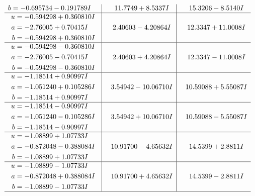\documentclass[1p]{elsarticle_modified}
\theoremstyle{definition}
\begin{document}
$$\begin{array}{c|c|c}
\begin{aligned}
b &= -0.695734 - 0.191789 I\end{aligned}
 & \phantom{-}11.7749 + 8.5337 I & \phantom{-}15.3206 - 8.5140 I \\ \hline\begin{aligned}
u &= -0.594298 + 0.360810 I \\
a &= -2.76005 + 0.70415 I \\
b &= -0.594298 + 0.360810 I\end{aligned}
 & \phantom{-}2.40603 - 4.20864 I & \phantom{-}12.3347 + 11.0008 I \\ \hline\begin{aligned}
u &= -0.594298 - 0.360810 I \\
a &= -2.76005 - 0.70415 I \\
b &= -0.594298 - 0.360810 I\end{aligned}
 & \phantom{-}2.40603 + 4.20864 I & \phantom{-}12.3347 - 11.0008 I \\ \hline\begin{aligned}
u &= -1.18514 + 0.90997 I \\
a &= -1.051240 + 0.105286 I \\
b &= -1.18514 + 0.90997 I\end{aligned}
 & \phantom{-}3.54942 - 10.06710 I & \phantom{-}10.59088 + 5.55087 I \\ \hline\begin{aligned}
u &= -1.18514 - 0.90997 I \\
a &= -1.051240 - 0.105286 I \\
b &= -1.18514 - 0.90997 I\end{aligned}
 & \phantom{-}3.54942 + 10.06710 I & \phantom{-}10.59088 - 5.55087 I \\ \hline\begin{aligned}
u &= -1.08899 + 1.07733 I \\
a &= -0.872048 - 0.388084 I \\
b &= -1.08899 + 1.07733 I\end{aligned}
 & \phantom{-}10.91700 - 4.65632 I & \phantom{-}14.5399 + 2.8811 I \\ \hline\begin{aligned}
u &= -1.08899 - 1.07733 I \\
a &= -0.872048 + 0.388084 I \\
b &= -1.08899 - 1.07733 I\end{aligned}
 & \phantom{-}10.91700 + 4.65632 I & \phantom{-}14.5399 - 2.8811 I\\
 \hline 
 \end{array}$$\newpage\newpage\renewcommand{\arraystretch}{1}
\end{document}
